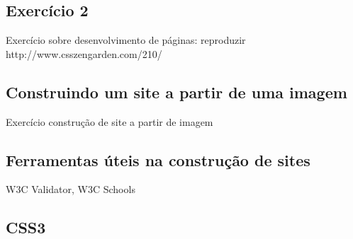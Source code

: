 \subsection{Exercício 2}
Exercício sobre desenvolvimento de páginas: reproduzir http://www.csszengarden.com/210/

\subsection{Construindo um site a partir de uma imagem}
Exercício construção de site a partir de imagem

\subsection{Ferramentas úteis na construção de sites}
W3C Validator, W3C Schools

\subsection{CSS3}
